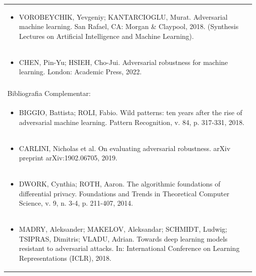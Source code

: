 \documentclass[11pt]{article}
\begin{document}
\begin{center}
\begin{longtable}{|p{4cm}|p{4cm}|p{4cm}|p{4cm}|}
\multicolumn{4}{|p{\dimexpr 16cm + 6\tabcolsep\relax}|}{\begin{itemize}\item VOROBEYCHIK, Yevgeniy; KANTARCIOGLU, Murat. Adversarial machine learning. San Rafael, CA: Morgan \& Claypool, 2018. (Synthesis Lectures on Artificial Intelligence and Machine Learning).\end{itemize}}\\
\multicolumn{4}{|p{\dimexpr 16cm + 6\tabcolsep\relax}|}{\begin{itemize}\item CHEN, Pin-Yu; HSIEH, Cho-Jui. Adversarial robustness for machine learning. London: Academic Press, 2022.\end{itemize}}\\
\multicolumn{4}{|p{16cm}|}{}\\
\hline
\multicolumn{4}{|p{16cm}|}{Bibliografia Complementar:}\\*
\multicolumn{4}{|p{\dimexpr 16cm + 6\tabcolsep\relax}|}{\begin{itemize}\item BIGGIO, Battista; ROLI, Fabio. Wild patterns: ten years after the rise of adversarial machine learning. Pattern Recognition, v. 84, p. 317-331, 2018.\end{itemize}}\\
\multicolumn{4}{|p{\dimexpr 16cm + 6\tabcolsep\relax}|}{\begin{itemize}\item CARLINI, Nicholas et al. On evaluating adversarial robustness. arXiv preprint arXiv:1902.06705, 2019.\end{itemize}}\\
\multicolumn{4}{|p{\dimexpr 16cm + 6\tabcolsep\relax}|}{\begin{itemize}\item DWORK, Cynthia; ROTH, Aaron. The algorithmic foundations of differential privacy. Foundations and Trends in Theoretical Computer Science, v. 9, n. 3-4, p. 211-407, 2014.\end{itemize}}\\
\multicolumn{4}{|p{\dimexpr 16cm + 6\tabcolsep\relax}|}{\begin{itemize}\item MADRY, Aleksander; MAKELOV, Aleksandar; SCHMIDT, Ludwig; TSIPRAS, Dimitris; VLADU, Adrian. Towards deep learning models resistant to adversarial attacks. In: International Conference on Learning Representations (ICLR), 2018.\end{itemize}}\\

\end{longtable}
\end{center}
\end{document}

